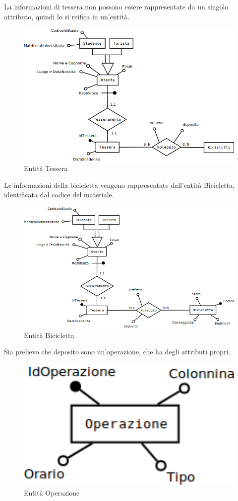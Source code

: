 \documentclass[a4paper,twoside]{article}
\begin{document}
La informazioni di tessera non possono essere rappresentate da un singolo attributo, quindi lo si reifica in un'entità.
\begin{figure}[H]
 \centering
  \includegraphics[width=1\textwidth]{Immagini-Grafici/Concettuale04.png}
\caption{Entità Tessera}
\end{figure}
Le informazioni della bicicletta vengono rappresentate dall'entità Bicicletta, identificata dal codice del materiale.
\begin{figure}[H]
 \centering
  \includegraphics[width=1\textwidth]{Immagini-Grafici/Concettuale05.png}
\caption{Entità Bicicletta}
\end{figure}
Sia prelievo che deposito sono un'operazione, che ha degli attributi propri.
\begin{figure}[H]
 \centering
  \includegraphics[width=1\textwidth]{Immagini-Grafici/Concettuale06.png}
\caption{Entità Operazione}
\end{figure}
\end{document}
